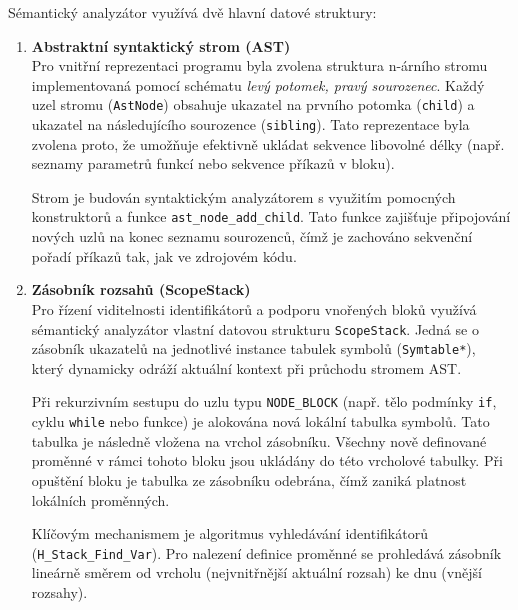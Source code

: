 Sémantický analyzátor využívá dvě hlavní datové struktury:

\begin{enumerate}
    \item \textbf{Abstraktní syntaktický strom (AST)} \\
    Pro vnitřní reprezentaci programu byla zvolena struktura n-árního stromu implementovaná pomocí schématu \textit{levý potomek, pravý sourozenec}. Každý uzel stromu (\texttt{AstNode}) obsahuje ukazatel na prvního potomka (\texttt{child}) a ukazatel na následujícího sourozence (\texttt{sibling}). Tato reprezentace byla zvolena proto, že umožňuje efektivně ukládat sekvence libovolné délky (např. seznamy parametrů funkcí nebo sekvence příkazů v bloku).
    
    Strom je budován syntaktickým analyzátorem s využitím pomocných konstruktorů a funkce \texttt{ast\_node\_add\_child}. Tato funkce zajišťuje připojování nových uzlů na konec seznamu sourozenců, čímž je zachováno sekvenční pořadí příkazů tak, jak ve zdrojovém kódu.

    \item \textbf{Zásobník rozsahů (ScopeStack)} \\
    Pro řízení viditelnosti identifikátorů a podporu vnořených bloků využívá sémantický analyzátor vlastní datovou strukturu \texttt{ScopeStack}. Jedná se o zásobník ukazatelů na jednotlivé instance tabulek symbolů (\texttt{Symtable*}), který dynamicky odráží aktuální kontext při průchodu stromem AST. 
    
    Při rekurzivním sestupu do uzlu typu \texttt{NODE\_BLOCK} (např. tělo podmínky \texttt{if}, cyklu \texttt{while} nebo funkce) je alokována nová lokální tabulka symbolů. Tato tabulka je následně vložena na vrchol zásobníku. Všechny nově definované proměnné v rámci tohoto bloku jsou ukládány do této vrcholové tabulky. Při opuštění bloku je tabulka ze zásobníku odebrána, čímž zaniká platnost lokálních proměnných. 
    
    Klíčovým mechanismem je algoritmus vyhledávání identifikátorů (\texttt{H\_Stack\_Find\_Var}). Pro nalezení definice proměnné se prohledává zásobník lineárně směrem od vrcholu (nejvnitřnější aktuální rozsah) ke dnu (vnější rozsahy).
\end{enumerate}
